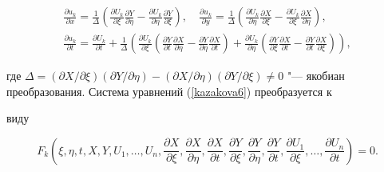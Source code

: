 \begin{gather*}

\frac{\partial u_k}{\partial x}=\frac{1}{\Delta}

\left(\frac{\partial U_k}{\partial \xi} \frac{\partial Y}{\partial \eta} - \frac{\partial U_k}{\partial \eta} \frac{\partial Y}{\partial \xi}\right),\quad

\frac{\partial u_k}{\partial y}=\frac{1}{\Delta}

\left(\frac{\partial U_k}{\partial \eta} \frac{\partial X}{\partial \xi} -\frac{\partial U_k}{\partial \xi} \frac{\partial X}{\partial \eta}\right),\\

\frac{\partial u_k}{\partial t}=\frac{\partial U_k}{\partial t}+

\frac{1}{\Delta}

\left(\frac{\partial U_k}{\partial \xi}\left(\frac{\partial Y}{\partial t} \frac{\partial X}{\partial \eta}- \frac{\partial Y}{\partial \eta} \frac{\partial X}{\partial t}\right)

+ \frac{\partial U_k}{\partial \eta}\left(\frac{\partial Y}{\partial \xi} \frac{\partial X}{\partial t}- \frac{\partial Y}{\partial t} \frac{\partial X}{\partial \xi}\right)\right),

\end{gather*}

где  $\Delta=  ({\partial X}/{\partial \xi}) ({\partial Y}/{\partial \eta})- ({\partial X}/{\partial \eta}) ({\partial Y}/{\partial \xi})\ne 0$ "--- якобиан преобразования. Система уравнений (\ref{kazakova6}) преобразуется к

виду

\begin{equation}

\label{kazakova9}\!

F_k\left(\xi,\eta,t,X,Y,U_1,\ldots,U_n,\frac{\displaystyle\partial X}{\displaystyle\partial

\xi},\frac{\displaystyle\partial X}{\displaystyle\partial \eta},\frac{\displaystyle\partial X}{\displaystyle\partial

t},\frac{\displaystyle\partial Y}{\displaystyle\partial \xi},\frac{\displaystyle\partial Y}{\displaystyle\partial

\eta},\frac{\displaystyle\partial Y}{\displaystyle\partial t},\frac{\displaystyle\partial U_1}{\displaystyle\partial

\xi},\dots,\frac{\displaystyle\partial U_n}{\displaystyle\partial t}\right){=}0.\!\!\!

\end{equation}

